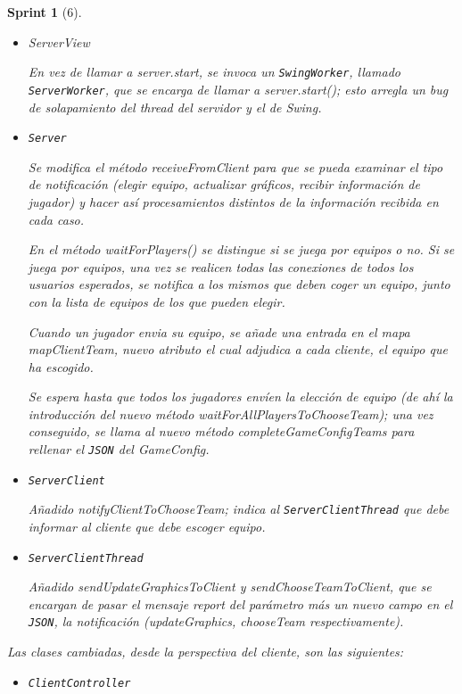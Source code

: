 \documentclass[12pt,a4paper,openright]{book}
\theoremstyle{break}
\newtheorem*{sprint}{Sprint}
\begin{document}
\begin{sprint}[6]
\begin{itemize}
\item ServerView

En vez de llamar a server.start, se invoca un \texttt{SwingWorker}, llamado \texttt{ServerWorker}, que se encarga de llamar a server.start(); esto arregla un bug de solapamiento del thread del servidor y el de Swing.

\item \texttt{Server}

Se modifica el método receiveFromClient para que se pueda examinar el tipo de notificación (elegir equipo, actualizar gráficos, recibir información de jugador) y hacer así procesamientos distintos de la información recibida en cada caso.

En el método waitForPlayers() se distingue si se juega por equipos o no. Si se juega por equipos, una vez se realicen todas las conexiones de todos los usuarios esperados, se notifica a los mismos que deben coger un equipo, junto con la lista de equipos de los que pueden elegir.

Cuando un jugador envia su equipo, se añade una entrada en el mapa mapClientTeam, nuevo atributo el cual adjudica a cada cliente, el equipo que ha escogido.

Se espera hasta que todos los jugadores envíen la elección de equipo (de ahí la introducción del nuevo método waitForAllPlayersToChooseTeam); una vez conseguido, se llama al nuevo método completeGameConfigTeams para rellenar el \texttt{JSON} del GameConfig.

\item \texttt{ServerClient}

Añadido notifyClientToChooseTeam; indica al \texttt{ServerClientThread} que debe informar al cliente que debe escoger equipo.

\item \texttt{ServerClientThread}

Añadido sendUpdateGraphicsToClient y sendChooseTeamToClient, que se encargan de pasar el mensaje report del parámetro más un nuevo campo en el \texttt{JSON}, la notificación (updateGraphics, chooseTeam respectivamente).

\end{itemize}

Las clases cambiadas, desde la perspectiva del cliente, son las siguientes:

\begin{itemize}

\item \texttt{ClientController}


\end{itemize}
\end{sprint}
\end{document}
